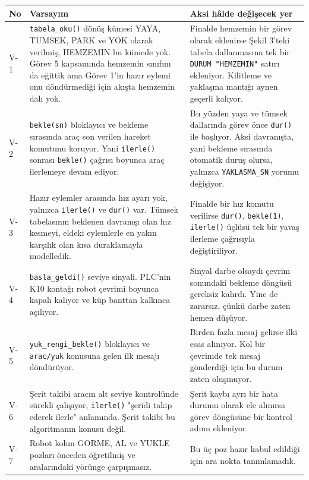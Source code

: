 \documentclass[11pt,a4paper]{article}
\newcommand{\ey}[1]{\texttt{#1}}
\begin{document}
\begin{longtable}{@{}p{0.9cm}p{6.6cm}p{7.2cm}@{}}
\toprule
\textbf{No} & \textbf{Varsayım} & \textbf{Aksi hâlde değişecek yer} \\
\midrule
\endhead
V-1 &
\ey{tabela\_oku()} dönüş kümesi YAYA, TUMSEK, PARK ve YOK olarak verilmiş,
HEMZEMIN bu kümede yok. Görev 5 kapsamında hemzemin sınıfını da eğittik ama
Görev 1'in hazır eylemi onu döndürmediği için akışta hemzemin dalı yok. &
Finalde hemzemin bir görev olarak eklenirse Şekil 3'teki tabela dallanmasına
tek bir \ey{DURUM "HEMZEMIN"} satırı ekleniyor. Kilitleme ve yaklaşma mantığı
aynen geçerli kalıyor. \\
\addlinespace
V-2 &
\ey{bekle(sn)} bloklayıcı ve bekleme sırasında araç son verilen hareket
komutunu koruyor. Yani \ey{ilerle()} sonrası \ey{bekle()} çağrısı boyunca araç
ilerlemeye devam ediyor. &
Bu yüzden yaya ve tümsek dallarında görev önce \ey{dur()} ile başlıyor. Aksi
davranışta, yani bekleme sırasında otomatik duruş olursa, yalnızca
\ey{YAKLASMA\_SN} yorumu değişiyor. \\
\addlinespace
V-3 &
Hazır eylemler arasında hız ayarı yok, yalnızca \ey{ilerle()} ve \ey{dur()}
var. Tümsek tabelasının beklenen davranışı olan hız kesmeyi, eldeki eylemlerle
en yakın karşılık olan kısa duraklamayla modelledik. &
Finalde bir hız komutu verilirse \ey{dur()}, \ey{bekle(1)}, \ey{ilerle()}
üçlüsü tek bir yavaş ilerleme çağrısıyla değiştiriliyor. \\
\addlinespace
V-4 &
\ey{basla\_geldi()} seviye sinyali. PLC'nin K10 kontağı robot çevrimi boyunca
kapalı kalıyor ve küp banttan kalkınca açılıyor. &
Sinyal darbe olsaydı çevrim sonundaki bekleme döngüsü gereksiz kalırdı. Yine de
zararsız, çünkü darbe zaten hemen düşüyor. \\
\addlinespace
V-5 &
\ey{yuk\_rengi\_bekle()} bloklayıcı ve \ey{arac/yuk} konusuna gelen ilk mesajı
döndürüyor. &
Birden fazla mesaj gelirse ilki esas alınıyor. Kol bir çevrimde tek mesaj
gönderdiği için bu durum zaten oluşmuyor. \\
\addlinespace
V-6 &
Şerit takibi aracın alt seviye kontrolünde sürekli çalışıyor, \ey{ilerle()}
"şeridi takip ederek ilerle" anlamında. Şerit takibi bu algoritmanın konusu
değil. &
Şerit kaybı ayrı bir hata durumu olarak ele alınırsa görev döngüsüne bir
kontrol adımı ekleniyor. \\
\addlinespace
V-7 &
Robot kolun GORME, AL ve YUKLE pozları önceden öğretilmiş ve aralarındaki
yörünge çarpışmasız. &
Bu üç poz hazır kabul edildiği için ara nokta tanımlamadık. \\
\bottomrule
\end{longtable}
\end{document}
